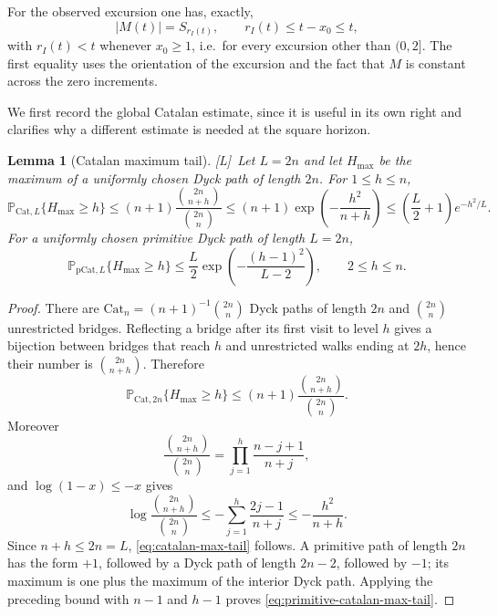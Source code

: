 \documentclass[11pt,reqno]{amsart}
\numberwithin{equation}{section}
\theoremstyle{plain}
\newtheorem{lemma}[theorem]{Lemma}
\theoremstyle{definition}
\theoremstyle{remark}
\newcommand{\tagL}{\textup{[L]}}
\begin{document}
For the observed excursion one has, exactly,
\begin{equation}
\label{eq:support-time-height}
 |M(t)|=S_{r_I(t)},
 \qquad
 r_I(t)\le t-x_0\le t,
\end{equation}
with $r_I(t)<t$ whenever $x_0\ge1$, i.e.\ for every excursion other than $(0,2]$.
The first equality uses the orientation of the excursion and the fact that
$M$ is constant across the zero increments.

We first record the global Catalan estimate, since it is useful in its own
right and clarifies why a different estimate is needed at the square
horizon.

\begin{lemma}[Catalan maximum tail]
\label{lem:catalan-max-tail}
\tagL\ Let $L=2n$ and let $H_{\max}$ be the maximum of a uniformly chosen Dyck path
of length $2n$.  For $1\le h\le n$,
\begin{equation}
\label{eq:catalan-max-tail}
 \mathbb P_{\mathrm{Cat},L}\{H_{\max}\ge h\}
 \le (n+1)\frac{\binom{2n}{n+h}}{\binom{2n}{n}}
 \le (n+1)\exp\!\left(-\frac{h^2}{n+h}\right)
 \le \left(\frac L2+1\right)e^{-h^2/L}.
\end{equation}
For a uniformly chosen primitive Dyck path of length $L=2n$,
\begin{equation}
\label{eq:primitive-catalan-max-tail}
 \mathbb P_{\mathrm{pCat},L}\{H_{\max}\ge h\}
 \le \frac L2\exp\!\left(-\frac{(h-1)^2}{L-2}\right),
 \qquad 2\le h\le n.
\end{equation}
\end{lemma}

\begin{proof}
There are $\mathrm{Cat}_n=(n+1)^{-1}\binom{2n}{n}$ Dyck paths of length $2n$ and
$\binom{2n}{n}$ unrestricted bridges.  Reflecting a bridge after its first
visit to level $h$ gives a bijection between bridges that reach $h$ and
unrestricted walks ending at $2h$, hence their number is
$\binom{2n}{n+h}$.  Therefore
\begin{equation}
 \mathbb P_{\mathrm{Cat},2n}\{H_{\max}\ge h\}
 \le (n+1)\frac{\binom{2n}{n+h}}{\binom{2n}{n}}.
\end{equation}
Moreover
\begin{equation}
 \frac{\binom{2n}{n+h}}{\binom{2n}{n}}
 =\prod_{j=1}^h\frac{n-j+1}{n+j},
\end{equation}
and $\log(1-x)\le-x$ gives
\begin{equation}
 \log\frac{\binom{2n}{n+h}}{\binom{2n}{n}}
 \le-\sum_{j=1}^h\frac{2j-1}{n+j}
 \le-\frac{h^2}{n+h}.
\end{equation}
Since $n+h\le2n=L$, \eqref{eq:catalan-max-tail} follows.  A primitive path
of length $2n$ has the form $+1$, followed by a Dyck path of length $2n-2$,
followed by $-1$; its maximum is one plus the maximum of the interior Dyck
path.  Applying the preceding bound with $n-1$ and $h-1$ proves
\eqref{eq:primitive-catalan-max-tail}.
\end{proof}
\end{document}
